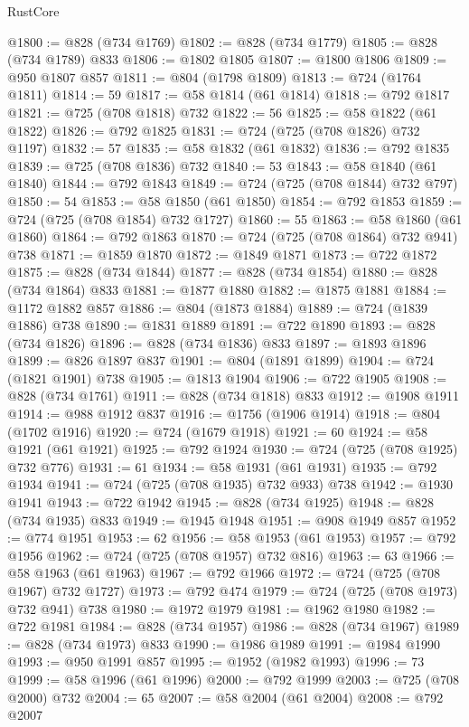 \begin{lexlean}{RustCore}
\begin{coremodule}
@1800 := @828 (@734 @1769)
@1802 := @828 (@734 @1779)
@1805 := @828 (@734 @1789) @833
@1806 := @1802 @1805
@1807 := @1800 @1806
@1809 := @950 @1807 @857
@1811 := @804 (@1798 @1809)
@1813 := @724 (@1764 @1811)
@1814 := 59
@1817 := @58 @1814 (@61 @1814)
@1818 := @792 @1817
@1821 := @725 (@708 @1818) @732
@1822 := 56
@1825 := @58 @1822 (@61 @1822)
@1826 := @792 @1825
@1831 := @724 (@725 (@708 @1826) @732 @1197)
@1832 := 57
@1835 := @58 @1832 (@61 @1832)
@1836 := @792 @1835
@1839 := @725 (@708 @1836) @732
@1840 := 53
@1843 := @58 @1840 (@61 @1840)
@1844 := @792 @1843
@1849 := @724 (@725 (@708 @1844) @732 @797)
@1850 := 54
@1853 := @58 @1850 (@61 @1850)
@1854 := @792 @1853
@1859 := @724 (@725 (@708 @1854) @732 @1727)
@1860 := 55
@1863 := @58 @1860 (@61 @1860)
@1864 := @792 @1863
@1870 := @724 (@725 (@708 @1864) @732 @941) @738
@1871 := @1859 @1870
@1872 := @1849 @1871
@1873 := @722 @1872
@1875 := @828 (@734 @1844)
@1877 := @828 (@734 @1854)
@1880 := @828 (@734 @1864) @833
@1881 := @1877 @1880
@1882 := @1875 @1881
@1884 := @1172 @1882 @857
@1886 := @804 (@1873 @1884)
@1889 := @724 (@1839 @1886) @738
@1890 := @1831 @1889
@1891 := @722 @1890
@1893 := @828 (@734 @1826)
@1896 := @828 (@734 @1836) @833
@1897 := @1893 @1896
@1899 := @826 @1897 @837
@1901 := @804 (@1891 @1899)
@1904 := @724 (@1821 @1901) @738
@1905 := @1813 @1904
@1906 := @722 @1905
@1908 := @828 (@734 @1761)
@1911 := @828 (@734 @1818) @833
@1912 := @1908 @1911
@1914 := @988 @1912 @837
@1916 := @1756 (@1906 @1914)
@1918 := @804 (@1702 @1916)
@1920 := @724 (@1679 @1918)
@1921 := 60
@1924 := @58 @1921 (@61 @1921)
@1925 := @792 @1924
@1930 := @724 (@725 (@708 @1925) @732 @776)
@1931 := 61
@1934 := @58 @1931 (@61 @1931)
@1935 := @792 @1934
@1941 := @724 (@725 (@708 @1935) @732 @933) @738
@1942 := @1930 @1941
@1943 := @722 @1942
@1945 := @828 (@734 @1925)
@1948 := @828 (@734 @1935) @833
@1949 := @1945 @1948
@1951 := @908 @1949 @857
@1952 := @774 @1951
@1953 := 62
@1956 := @58 @1953 (@61 @1953)
@1957 := @792 @1956
@1962 := @724 (@725 (@708 @1957) @732 @816)
@1963 := 63
@1966 := @58 @1963 (@61 @1963)
@1967 := @792 @1966
@1972 := @724 (@725 (@708 @1967) @732 @1727)
@1973 := @792 @474
@1979 := @724 (@725 (@708 @1973) @732 @941) @738
@1980 := @1972 @1979
@1981 := @1962 @1980
@1982 := @722 @1981
@1984 := @828 (@734 @1957)
@1986 := @828 (@734 @1967)
@1989 := @828 (@734 @1973) @833
@1990 := @1986 @1989
@1991 := @1984 @1990
@1993 := @950 @1991 @857
@1995 := @1952 (@1982 @1993)
@1996 := 73
@1999 := @58 @1996 (@61 @1996)
@2000 := @792 @1999
@2003 := @725 (@708 @2000) @732
@2004 := 65
@2007 := @58 @2004 (@61 @2004)
@2008 := @792 @2007

\end{coremodule}
\end{lexlean}

